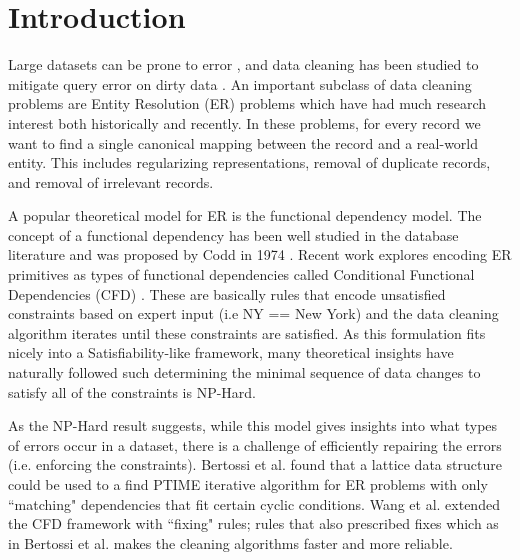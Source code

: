 \section{Introduction}
Large datasets can be prone to error \cite{Gartner}, and data cleaning has been studied to mitigate query error on dirty data \cite{dasu2003exploratory, mayfield2010eracer, openrefine, wrangler, DBLP:conf/sigmod/DallachiesaEEEIOT13, DBLP:conf/pervasive/JefferyAFHW06}.
An important subclass of data cleaning problems are Entity Resolution (ER) problems which have had much research interest both historically and recently. \cite{DBLP:journals/pvldb/KopckeTR10, conf/dmkd/MongeE97, conf/sigmod/WhangMKTG09, conf/acl/FinkelM08, conf/sigmod/WangLF12, Fellegi1969, conf/sigmod/ArasuGK10, DBLP:journals/tkde/ElmagarmidIV07, journals/tkde/Christen11, getoor2005link}
In these problems, for every record we want to find a single canonical mapping between the record and a real-world entity.
This includes regularizing representations, removal of duplicate records, and removal of irrelevant records.

A popular theoretical model for ER is the functional dependency model.
The concept of a functional dependency has been well studied in the database literature 
and was proposed by Codd in 1974 \cite{codd1974recent}.
Recent work explores encoding ER primitives as types of functional dependencies called Conditional Functional Dependencies (CFD) \cite{bertossi2013data, fan2014interaction, fan2008conditional}.
These are basically rules that encode unsatisfied constraints based on expert input (i.e NY == New York) and the data cleaning algorithm iterates until these constraints are satisfied.
As this formulation fits nicely into a Satisfiability-like framework, many theoretical insights have naturally followed such determining the minimal sequence of data changes to satisfy all of the constraints is NP-Hard.

As the NP-Hard result suggests, while this model gives insights into what types of errors occur in a dataset, there is a challenge of efficiently repairing the errors (i.e. enforcing the constraints).
Bertossi et al. \cite{bertossi2013data} found that a lattice data structure could be used to a find PTIME iterative algorithm for ER problems with only ``matching" dependencies that fit certain cyclic conditions.
Wang et al. \cite{wang2014towards} extended the CFD framework with ``fixing" rules; rules that also prescribed fixes which as in Bertossi et al. makes the cleaning algorithms faster and more reliable.

